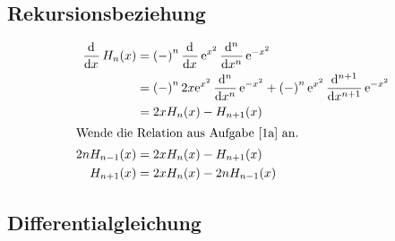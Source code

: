 \subsection{Rekursionsbeziehung}

\begin{align*}
	\dod{}x H_n(x)
	&= \del-^n \dod{}x \ee^{x^2} \dod[n]{}x \ee^{-x^2} \\
	&= \del-^n 2x \ee^{x^2} \dod[n]{}x \ee^{-x^2} + \del-^n \ee^{x^2} \dod[n+1]{}x \ee^{-x^2} \\
	&= 2x H_n(x) - H_{n+1}(x) \\
	\intertext{%
		Wende die Relation aus Aufgabe \ref{1a} an.
	}
	2n H_{n-1}(x)
	&= 2x H_n(x) - H_{n+1}(x) \\
	H_{n+1}(x)
	&= 2x H_n(x) - 2n H_{n-1}(x)
\end{align*}

\subsection{Differentialgleichung}


\IfFileExists{\bibliographyfile}{
	
}{}



